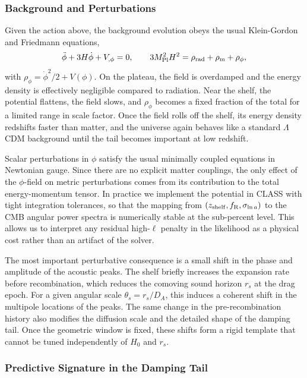 \documentclass[a4paper,11pt]{article}
\begin{document}
\subsubsection{Background and Perturbations}

Given the action above, the background evolution obeys the usual Klein-Gordon and Friedmann equations,
\begin{equation}
\ddot{\phi} + 3 H \dot{\phi} + V_{,\phi} = 0, \qquad
3 M_{\rm Pl}^2 H^2 = \rho_{\rm rad} + \rho_{\rm m} + \rho_{\phi},
\end{equation}
with $\rho_{\phi} = \dot{\phi}^2/2 + V(\phi)$. On the plateau, the field is overdamped and the energy density is effectively negligible compared to radiation. Near the shelf, the potential flattens, the field slows, and $\rho_{\phi}$ becomes a fixed fraction of the total for a limited range in scale factor. Once the field rolls off the shelf, its energy density redshifts faster than matter, and the universe again behaves like a standard $\Lambda$CDM background until the tail becomes important at low redshift.

Scalar perturbations in $\phi$ satisfy the usual minimally coupled equations in Newtonian gauge. Since there are no explicit matter couplings, the only effect of the $\phi$-field on metric perturbations comes from its contribution to the total energy-momentum tensor. In practice we implement the potential in CLASS with tight integration tolerances, so that the mapping from $(z_{\rm shelf}, f_{\rm R}, \sigma_{\ln a})$ to the CMB angular power spectra is numerically stable at the sub-percent level. This allows us to interpret any residual high-$\ell$ penalty in the likelihood as a physical cost rather than an artifact of the solver.

The most important perturbative consequence is a small shift in the phase and amplitude of the acoustic peaks. The shelf briefly increases the expansion rate before recombination, which reduces the comoving sound horizon $r_{s}$ at the drag epoch. For a given angular scale $\theta_{s} = r_{s}/D_{A}$, this induces a coherent shift in the multipole locations of the peaks. The same change in the pre-recombination history also modifies the diffusion scale and the detailed shape of the damping tail. Once the geometric window is fixed, these shifts form a rigid template that cannot be tuned independently of $H_{0}$ and $r_{s}$.

\subsubsection{Predictive Signature in the Damping Tail}
\end{document}

